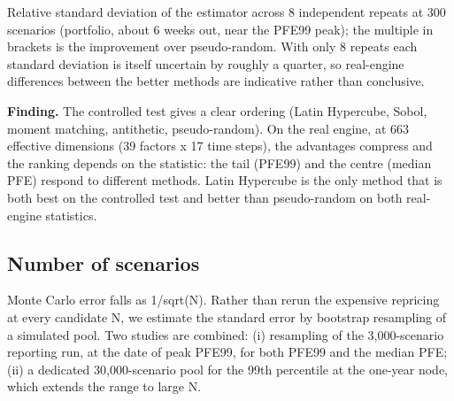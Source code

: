 \documentclass[11pt,letterpaper]{article}
\begin{document}
{\small Relative standard deviation of the estimator across 8 independent repeats at 300 scenarios (portfolio, about 6 weeks out, near the PFE99 peak); the multiple in brackets is the improvement over pseudo-random. With only 8 repeats each standard deviation is itself uncertain by roughly a quarter, so real-engine differences between the better methods are indicative rather than conclusive.}

\textbf{Finding.} The controlled test gives a clear ordering (Latin Hypercube, Sobol, moment matching, antithetic, pseudo-random). On the real engine, at 663 effective dimensions (39 factors x 17 time steps), the advantages compress and the ranking depends on the statistic: the tail (PFE99) and the centre (median PFE) respond to different methods. Latin Hypercube is the only method that is both best on the controlled test and better than pseudo-random on both real-engine statistics.

\begin{center}\end{center}
\subsection{Number of scenarios}
Monte Carlo error falls as 1/sqrt(N). Rather than rerun the expensive repricing at every candidate N, we estimate the standard error by bootstrap resampling of a simulated pool. Two studies are combined: (i) resampling of the 3,000-scenario reporting run, at the date of peak PFE99, for both PFE99 and the median PFE; (ii) a dedicated 30,000-scenario pool for the 99th percentile at the one-year node, which extends the range to large N.
\end{document}
